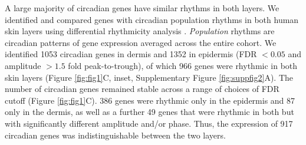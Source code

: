 A large majority of circadian genes have similar rhythms in both layers. We identified and compared genes with circadian population rhythms in both human skin layers using differential rhythmicity analysis \cite{Pelikan2021}. \textit{Population} rhythms are circadian patterns of gene expression averaged across the entire cohort. We identified 1053 circadian genes in dermis and 1352 in epidermis (FDR $<0.05$ and amplitude $>1.5$ fold peak-to-trough), of which 966 genes were rhythmic in both skin layers (Figure \ref{fig:fig1}C, inset, Supplementary Figure \ref{fig:suppfig2}A). The number of circadian genes remained stable across a range of choices of FDR cutoff (Figure \ref{fig:fig1}C). 386 genes were rhythmic only in the epidermis and 87 only in the dermis, as well as a further 49 genes that were rhythmic in both but with significantly different amplitude and/or phase. Thus, the expression of 917 circadian genes was indistinguishable between the two layers.
\newpage
